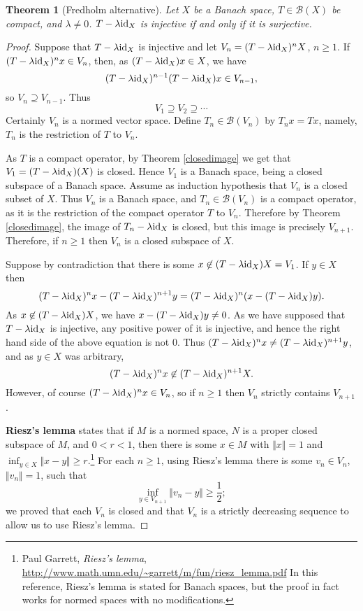 \documentclass{article}
\newcommand{\id}{\ensuremath\mathrm{id}}
\newcommand{\norm}[1]{\Vert #1 \Vert}
\newtheorem{theorem}{Theorem}
\begin{document}
\begin{theorem}[Fredholm alternative]
Let $X$ be a Banach space, $T \in \mathscr{B}(X)$ be compact, and $\lambda \neq 0$. $T- \lambda \id_X$ is injective if and only if it is surjective.
\end{theorem}
\begin{proof}
Suppose that $T-\lambda \id_X$ is injective and let $V_n = (T-\lambda \id_X)^n X$, $n \geq 1$.
If $(T-\lambda \id_X)^n x \in V_n$, then, as $(T-\lambda \id_X)x \in X$, we have
\[
(T-\lambda \id_X)^{n-1}(T-\lambda \id_X)x \in V_{n-1},
\]
so $V_n \supseteq V_{n-1}$. Thus
\[
V_1 \supseteq V_2 \supseteq \cdots
\]
Certainly $V_n$ is a normed vector space. Define $T_n \in \mathscr{B}(V_n)$ by $T_nx =Tx$, namely, $T_n$ is the restriction of $T$ to $V_n$.

As $T$ is a compact operator, by Theorem \ref{closedimage} we get that
$V_1=(T-\lambda \id_X)(X)$ is closed. Hence $V_1$ is a Banach space, being a closed subspace of a Banach space.
Assume as induction hypothesis that $V_n$ is a closed subset of $X$. Thus $V_n$ is a Banach space, and $T_n \in \mathscr{B}(V_n)$ is a compact operator, as it is
the restriction of the compact operator $T$ to $V_n$. Therefore by Theorem \ref{closedimage}, the image of $T_n-\lambda \id_X$ is closed, but this image is precisely
$V_{n+1}$. Therefore, if $n \geq 1$ then $V_n$ is a closed subspace of $X$. 
 
Suppose by contradiction that there is some $x  \not \in (T-\lambda \id_X)X=V_1$.  If $y \in X$ then
\[
(T-\lambda \id_X)^nx - (T-\lambda \id_X)^{n+1}y = (T-\lambda \id_X)^n ( x-(T-\lambda \id_X)y).
\]
As $x \not \in (T-\lambda \id_X)X$, we have $x - (T-\lambda \id_X)y \neq 0$.
As we have supposed that $T-\lambda \id_X$ is injective, any positive power of it is injective, and hence
the right hand side of the above equation is not $0$. Thus 
$(T-\lambda \id_X)^nx \neq (T-\lambda \id_X)^{n+1}y$, and as $y \in X$ was arbitrary,
\[
(T-\lambda \id_X)^n x  \not \in (T-\lambda \id_X)^{n+1}X.
\]
However, of course $(T-\lambda \id_X)^nx \in V_n$, so if $n \geq 1$ then $V_n$ strictly contains
$V_{n+1}$.

\textbf{Riesz's lemma} states that if $M$ is a normed space, $N$ is a proper closed subspace of $M$, and
$0<r<1$, then there is some $x \in M$ with $\norm{x}=1$ and $\inf_{y \in X} \norm{x-y} \geq r$.\footnote{Paul
Garrett, {\em Riesz's lemma},
\url{http://www.math.umn.edu/~garrett/m/fun/riesz_lemma.pdf} In this
reference, Riesz's lemma is stated for Banach spaces, but the proof in fact works for normed spaces with no modifications.
}
For each $n \geq 1$, using Riesz's lemma there is some $v_n \in V_n$, $\norm{v_n}=1$, such that
\[
\inf_{y \in V_{n+1}} \norm{v_n-y} \geq \frac{1}{2};
\]
we proved that each $V_n$ is closed and that  $V_n$ is a strictly decreasing sequence to allow us to use Riesz's lemma.


\end{proof}
\end{document}
